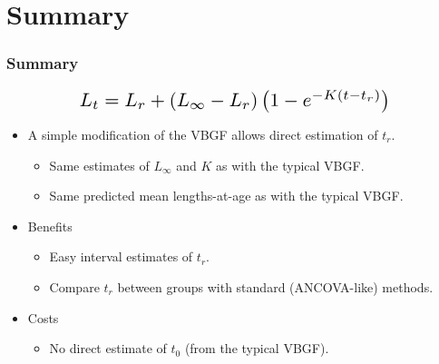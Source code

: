 \documentclass[xcolor=dvipsnames,t]{beamer}\usepackage[]{graphicx}\usepackage[]{color}
\newcommand*{\Scale}[2][4]{\scalebox{#1}{\ensuremath{#2}}}%
\begin{document}
\section{Summary}

\begin{frame}[fragile]
\frametitle{Summary}
\vspace{-14pt}
\[\Scale[1.5]{ L_{t} = L_{r} + \left(L_{\infty}-L_{r}\right)\left(1-e^{-K(t-t_{r})}\right) }\]
\bigskip
\begin{itemize}
  \item A simple modification of the VBGF allows direct estimation of $t_{r}$.
  \begin{itemize}
    \item Same estimates of $L_{\infty}$ and $K$ as with the typical VBGF.
    \item Same predicted mean lengths-at-age as with the typical VBGF.
  \end{itemize}
  \pause
  \bigskip
  \item Benefits
  \begin{itemize}
    \item Easy interval estimates of $t_{r}$.
    \item Compare $t_{r}$ between groups with standard (ANCOVA-like) methods.
  \end{itemize}
  \pause
  \smallskip
  \item Costs
  \begin{itemize}
    \item No direct estimate of $t_{0}$ (from the typical VBGF).
  \end{itemize}
\end{itemize}
\end{frame}


\end{document}
